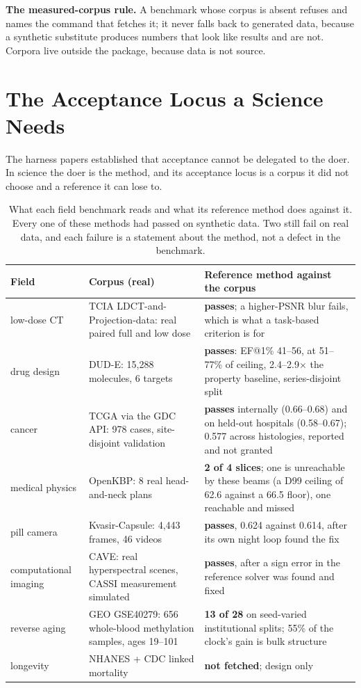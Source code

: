 \textbf{The measured-corpus rule.} A benchmark whose corpus is absent refuses and names the command that fetches it; it never falls back to generated data, because a synthetic substitute produces numbers that look like results and are not. Corpora live outside the package, because data is not source.

\section{The Acceptance Locus a Science Needs}\label{sec:locus}

The harness papers established that acceptance cannot be delegated to the doer. In science the doer is the method, and its acceptance locus is a corpus it did not choose and a reference it can lose to.

\begin{table}[!htbp]
\centering\scriptsize
\begin{tabularx}{\textwidth}{@{}lYY@{}}
\toprule
Field & Corpus (real) & Reference method against the corpus \\
\midrule
low-dose CT & TCIA LDCT-and-Projection-data: real paired full and low dose & \textbf{passes}; a higher-PSNR blur fails, which is what a task-based criterion is for \\
drug design & DUD-E: 15,288 molecules, 6 targets & \textbf{passes}: EF@1\% 41--56, at 51--77\% of ceiling, 2.4--2.9$\times$ the property baseline, series-disjoint split \\
cancer & TCGA via the GDC API: 978 cases, site-disjoint validation & \textbf{passes} internally (0.66--0.68) and on held-out hospitals (0.58--0.67); 0.577 across histologies, reported and not granted \\
medical physics & OpenKBP: 8 real head-and-neck plans & \textbf{2 of 4 slices}; one is unreachable by these beams (a D99 ceiling of 62.6 against a 66.5 floor), one reachable and missed \\
pill camera & Kvasir-Capsule: 4,443 frames, 46 videos & \textbf{passes}, 0.624 against 0.614, after its own night loop found the fix \\
computational imaging & CAVE: real hyperspectral scenes, CASSI measurement simulated & \textbf{passes}, after a sign error in the reference solver was found and fixed \\
reverse aging & GEO GSE40279: 656 whole-blood methylation samples, ages 19--101 & \textbf{13 of 28} on seed-varied institutional splits; 55\% of the clock's gain is bulk structure \\
longevity & NHANES + CDC linked mortality & \textbf{not fetched}; design only \\
\bottomrule
\end{tabularx}
\caption{What each field benchmark reads and what its reference method does against it. Every one of these methods had passed on synthetic data. Two still fail on real data, and each failure is a statement about the method, not a defect in the benchmark.}
\label{tab:corpora}
\end{table}

